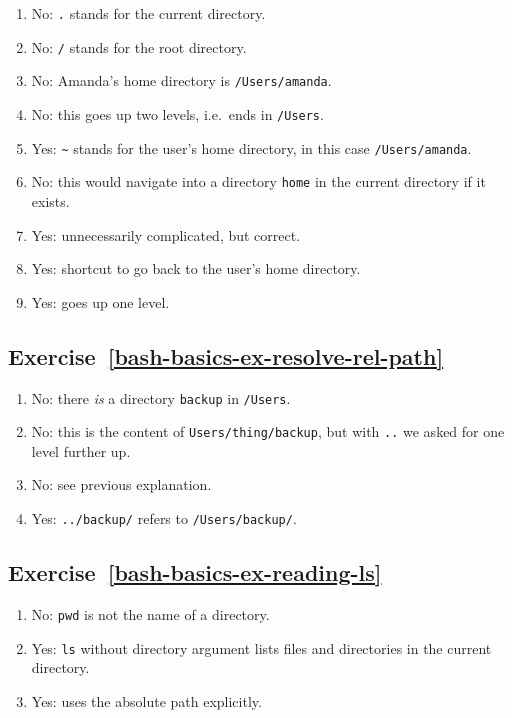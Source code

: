 \documentclass[
]{krantz}
\providecommand{\tightlist}{%
  \setlength{\itemsep}{0pt}\setlength{\parskip}{0pt}}
\begin{document}
\begin{enumerate}
\def\labelenumi{\arabic{enumi}.}
\tightlist
\item
  No: \texttt{.} stands for the current directory.
\item
  No: \texttt{/} stands for the root directory.
\item
  No: Amanda's home directory is \texttt{/Users/amanda}.
\item
  No: this goes up two levels, i.e.~ends in \texttt{/Users}.
\item
  Yes: \texttt{\textasciitilde{}} stands for the user's home directory, in this case \texttt{/Users/amanda}.
\item
  No: this would navigate into a directory \texttt{home} in the current directory if it exists.
\item
  Yes: unnecessarily complicated, but correct.
\item
  Yes: shortcut to go back to the user's home directory.
\item
  Yes: goes up one level.
\end{enumerate}

\hypertarget{exercise-refbash-basics-ex-resolve-rel-path}{%
\subsection*{Exercise~\ref{bash-basics-ex-resolve-rel-path}}\label{exercise-refbash-basics-ex-resolve-rel-path}}


\begin{enumerate}
\def\labelenumi{\arabic{enumi}.}
\tightlist
\item
  No: there \emph{is} a directory \texttt{backup} in \texttt{/Users}.
\item
  No: this is the content of \texttt{Users/thing/backup},
  but with \texttt{..} we asked for one level further up.
\item
  No: see previous explanation.
\item
  Yes: \texttt{../backup/} refers to \texttt{/Users/backup/}.
\end{enumerate}

\hypertarget{exercise-refbash-basics-ex-reading-ls}{%
\subsection*{Exercise~\ref{bash-basics-ex-reading-ls}}\label{exercise-refbash-basics-ex-reading-ls}}


\begin{enumerate}
\def\labelenumi{\arabic{enumi}.}
\tightlist
\item
  No: \texttt{pwd} is not the name of a directory.
\item
  Yes: \texttt{ls} without directory argument lists files and directories
  in the current directory.
\item
  Yes: uses the absolute path explicitly.
\end{enumerate}
\end{document}
